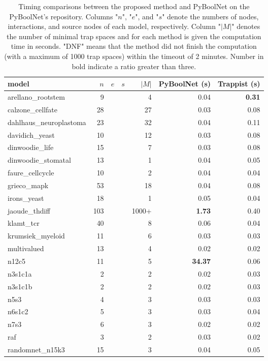 \documentclass[runningheads]{llncs}
\begin{document}
\begin{table}[!htb]
  \caption{Timing comparisons between the proposed method and PyBoolNet on the PyBoolNet's repository.
    Columns "\(n\)", "\(e\)", and "\(s\)" denote the numbers of nodes, interactions, and source nodes of each model, respectively. Column "\(|M|\)" denotes the number of minimal trap spaces and for each method is given the computation time in seconds.
    "DNF" means that the method did not finish the computation (with a maximum of 1000 trap spaces) within the timeout of 2 minutes. Number in bold indicate a ratio greater than three.}
  \centering
  \label{tab:pyboolnet_repo}
  \begin{tabular}{lrrrrrr}
    \toprule
    model & $n$ & $e$ & $s$ & $|M|$ & PyBoolNet (s) & Trappist (s) \\ \midrule
    arellano\_rootstem & 9 &&& 4 & 0.04 & \textbf{0.31}\\
    calzone\_cellfate & 28 &&& 27 & 0.03 & 0.08\\
    dahlhaus\_neuroplastoma & 23 &&& 32 & 0.04 & 0.11\\
    davidich\_yeast & 10 &&& 12 & 0.03 & 0.08\\
    dinwoodie\_life & 15 &&& 7 & 0.03 & 0.08\\
    dinwoodie\_stomatal & 13 &&& 1 & 0.04 & 0.05\\
    faure\_cellcycle & 10 &&& 2 & 0.04 & 0.04\\
    grieco\_mapk & 53 &&& 18 & 0.04 & 0.08\\
    irons\_yeast & 18 &&& 1 & 0.05 & 0.04\\
    jaoude\_thdiff & 103 &&& 1000+ & \textbf{1.73} & 0.40\\
    klamt\_tcr & 40 &&& 8 & 0.06 & 0.04\\
    krumsiek\_myeloid & 11 &&& 6 & 0.03 & 0.03\\
    multivalued & 13 &&& 4 & 0.02 & 0.02\\
    n12c5 & 11 &&& 5 & \textbf{34.37} & 0.06\\
    n3s1c1a & 2 &&& 2 & 0.02 & 0.03\\
    n3s1c1b & 2 &&& 2 & 0.02 & 0.03\\
    n5s3 & 4 &&& 3 & 0.03 & 0.03\\
    n6s1c2 & 5 &&& 3 & 0.03 & 0.04\\
    n7s3 & 6 &&& 3 & 0.02 & 0.02\\
    raf & 3 &&& 2 & 0.03 & 0.02\\
    randomnet\_n15k3 & 15 &&& 3 & 0.04 & 0.05\\

\end{tabular}
\end{table}
\end{document}
